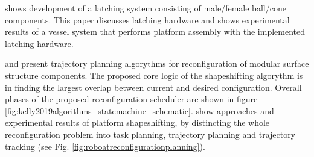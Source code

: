 \citet{mateos2019autonomous} shows development of a latching system consisting of male/female ball/cone components. This paper discusses latching hardware and shows experimental results of a vessel system that performs platform assembly with the implemented latching hardware.

\citet{8901099} and \citet{kelly2019algorithms} present trajectory planning algorythms for reconfiguration of modular surface structure components. The proposed core logic of the shapeshifting algorythm is in finding the largest overlap between current and desired configuration. Overall phases of the proposed reconfiguration scheduler are shown in figure \ref{fig:kelly2019algorithms_statemachine_schematic}. \citet{8901099} show approaches and experimental results of platform shapeshifting, by distincting the whole reconfiguration problem into task planning, trajectory planning and trajectory tracking (see Fig. \ref{fig:roboatreconfigurationplanning}). 

